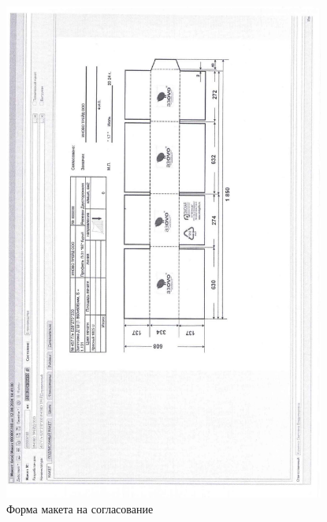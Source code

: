 \begin{figure}
\begin{center}
  \includegraphics[height=0.94\textheight, width=0.94\textwidth, keepaspectratio]{Pics/d09.jpg}
\end{center}
  \caption{Форма макета на согласование}
  \label{pic:d9}
\end{figure}

